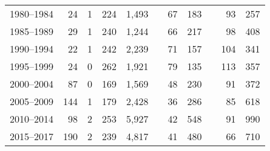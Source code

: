 \documentclass{article}
\begin{document}
\begin{table}[h]
{\begin{tabular}{rrrrrrrrrrr}
            1980–1984 & 24 & 1 & 224 & 1,493 & & 67 & 183 & & 93 & 257 \\
            1985–1989 & 29 & 1 & 240 & 1,244 & & 66 & 217 & & 98 & 408 \\
            1990–1994 & 22 & 1 & 242 & 2,239 & & 71 & 157 & & 104 & 341 \\
            1995–1999 & 24 & 0 & 262 & 1,921 & & 79 & 135 & & 113 & 357 \\
            2000–2004 & 87 & 0 & 169 & 1,569 & & 48 & 230 & & 91 & 372 \\
            2005–2009 & 144 & 1 & 179 & 2,428 & & 36 & 286 & & 85 & 618 \\
            2010–2014 & 98 & 2 & 253 & 5,927 & & 42 & 548 & & 91 & 990 \\
            2015–2017 & 190 & 2 & 239 & 4,817 & & 41 & 480 & & 66 & 710 \\
    
        \hline
        \end{tabular}%
        }
    \end{table}
\end{document}
